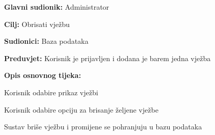 					\noindent {}
					\begin{packed_item}
						
						\item \textbf{Glavni sudionik:} Administrator
						\item  \textbf{Cilj:} Obrisati vježbu
						\item  \textbf{Sudionici:} Baza podataka
						\item  \textbf{Preduvjet:} Korisnik je prijavljen i dodana je barem jedna vježba
						\item  \textbf{Opis osnovnog tijeka:}
						
						\item[] \begin{packed_enum}
							
							\item Korisnik odabire prikaz vježbi
							\item Korisnik odabire opciju za brisanje željene vježbe
							\item Sustav briše vježbu i promijene se pohranjuju u bazu podataka
							
						\end{packed_enum}
						
						
					\end{packed_item}
				
